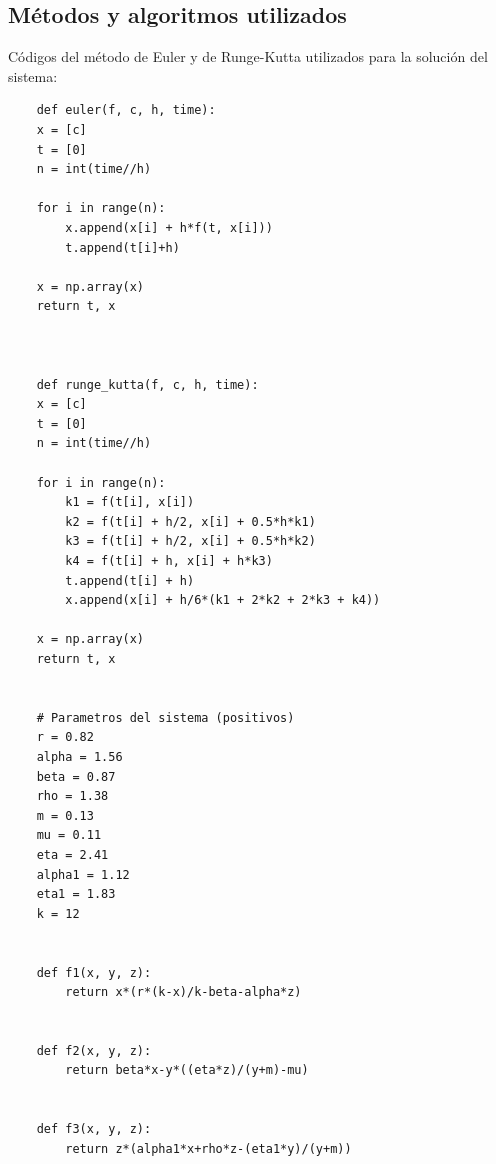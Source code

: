 \documentclass{wscpaperproc}
\theoremstyle{wsc}
\begin{document}
\FloatBarrier
\subsection{M\'etodos y algoritmos utilizados}
Códigos del método de Euler y de Runge-Kutta utilizados para la solución del sistema:
\begin{verbatim}
	def euler(f, c, h, time):
    x = [c]
    t = [0]
    n = int(time//h)

    for i in range(n):
        x.append(x[i] + h*f(t, x[i]))
        t.append(t[i]+h)
    
    x = np.array(x)
    return t, x


	
	def runge_kutta(f, c, h, time):
    x = [c]
    t = [0]
    n = int(time//h)
    
    for i in range(n):
        k1 = f(t[i], x[i])
        k2 = f(t[i] + h/2, x[i] + 0.5*h*k1)
        k3 = f(t[i] + h/2, x[i] + 0.5*h*k2)
        k4 = f(t[i] + h, x[i] + h*k3)
        t.append(t[i] + h)
        x.append(x[i] + h/6*(k1 + 2*k2 + 2*k3 + k4))

    x = np.array(x)
    return t, x
	
	
	# Parametros del sistema (positivos)
	r = 0.82
	alpha = 1.56
	beta = 0.87
	rho = 1.38
	m = 0.13
	mu = 0.11
	eta = 2.41
	alpha1 = 1.12
	eta1 = 1.83
	k = 12
	
	
	def f1(x, y, z):
		return x*(r*(k-x)/k-beta-alpha*z)
	
	
	def f2(x, y, z):
		return beta*x-y*((eta*z)/(y+m)-mu)
	
	
	def f3(x, y, z):
		return z*(alpha1*x+rho*z-(eta1*y)/(y+m))
	
\end{verbatim}
\end{document}
